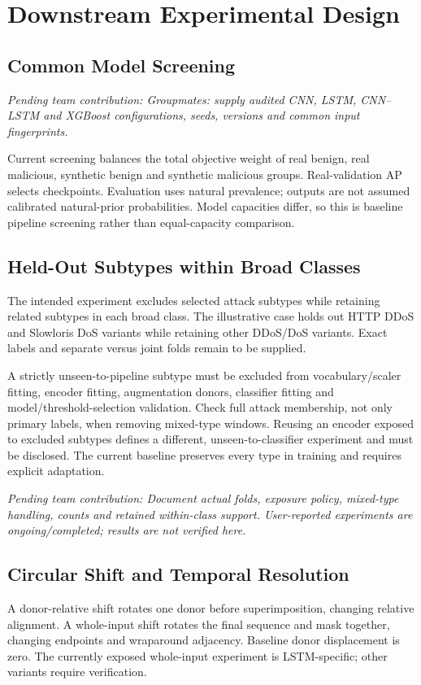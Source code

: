 \documentclass[conference]{IEEEtran}
\newcommand{\pending}[1]{\par\noindent\textit{Pending team contribution: #1}\par}
\begin{document}
\section{Downstream Experimental Design}
\subsection{Common Model Screening}
\pending{Groupmates: supply audited CNN, LSTM, CNN--LSTM and XGBoost configurations, seeds, versions and common input fingerprints.}
Current screening balances the total objective weight of real benign, real malicious, synthetic benign and synthetic malicious groups. Real-validation AP selects checkpoints. Evaluation uses natural prevalence; outputs are not assumed calibrated natural-prior probabilities. Model capacities differ, so this is baseline pipeline screening rather than equal-capacity comparison.

\subsection{Held-Out Subtypes within Broad Classes}
The intended experiment excludes selected attack subtypes while retaining related subtypes in each broad class. The illustrative case holds out HTTP DDoS and Slowloris DoS variants while retaining other DDoS/DoS variants. Exact labels and separate versus joint folds remain to be supplied.

A strictly unseen-to-pipeline subtype must be excluded from vocabulary/scaler fitting, encoder fitting, augmentation donors, classifier fitting and model/threshold-selection validation. Check full attack membership, not only primary labels, when removing mixed-type windows. Reusing an encoder exposed to excluded subtypes defines a different, unseen-to-classifier experiment and must be disclosed. The current baseline preserves every type in training and requires explicit adaptation.
\pending{Document actual folds, exposure policy, mixed-type handling, counts and retained within-class support. User-reported experiments are ongoing/completed; results are not verified here.}

\subsection{Circular Shift and Temporal Resolution}
A donor-relative shift rotates one donor before superimposition, changing relative alignment. A whole-input shift rotates the final sequence and mask together, changing endpoints and wraparound adjacency. Baseline donor displacement is zero. The currently exposed whole-input experiment is LSTM-specific; other variants require verification.
\end{document}
